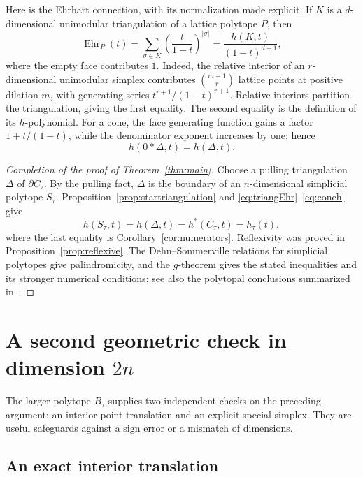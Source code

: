 \documentclass[11pt]{article}
\numberwithin{equation}{section}
\theoremstyle{definition}
\newcommand{\Ehr}{\operatorname{Ehr}}
\begin{document}
Here is the Ehrhart connection, with its normalization made explicit. If $K$
is a $d$-dimensional unimodular triangulation of a lattice polytope $P$, then
\begin{equation}
 \Ehr_P(t)=\sum_{\sigma\in K}
     \left(\frac{t}{1-t}\right)^{|\sigma|}
   =\frac{h(K,t)}{(1-t)^{d+1}},\label{eq:triangEhr}
\end{equation}
where the empty face contributes $1$. Indeed, the relative interior of an
$r$-dimensional unimodular simplex contributes $\binom{m-1}{r}$ lattice points
at positive dilation $m$, with generating series
$t^{r+1}/(1-t)^{r+1}$. Relative interiors partition the triangulation, giving
the first equality. The second equality is the definition of its
$h$-polynomial. For a cone, the face generating function gains a factor
$1+t/(1-t)$, while the denominator exponent increases by one; hence
\begin{equation}
 h(0*\Delta,t)=h(\Delta,t).\label{eq:coneh}
\end{equation}

\begin{proof}[Completion of the proof of Theorem~\ref{thm:main}]
Choose a pulling triangulation $\Delta$ of $\partial C_\tau$. By the pulling
fact, $\Delta$ is the boundary of an $n$-dimensional simplicial polytope
$S_\tau$. Proposition~\ref{prop:startriangulation} and
\eqref{eq:triangEhr}--\eqref{eq:coneh} give
\[
 h(S_\tau,t)=h(\Delta,t)=h^*(C_\tau,t)=h_\tau(t),
\]
where the last equality is Corollary~\ref{cor:numerators}. Reflexivity was
proved in Proposition~\ref{prop:reflexive}. The Dehn--Sommerville relations
for simplicial polytopes give palindromicity, and the $g$-theorem gives the
stated inequalities and its stronger numerical conditions; see also the
polytopal conclusions summarized in~\cite[Theorem~3.5]{AthSpecial}.
\end{proof}

\section{A second geometric check in dimension \texorpdfstring{$2n$}{2n}}\label{sec:second}

The larger polytope $B_\tau$ supplies two independent checks on the preceding
argument: an interior-point translation and an explicit special simplex. They
are useful safeguards against a sign error or a mismatch of dimensions.

\subsection{An exact interior translation}
\end{document}
